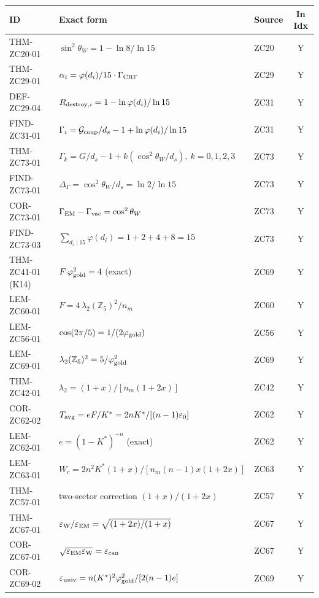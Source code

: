 \documentclass[11pt, a4paper]{article}
\newcommand{\swsq}{\sin^2\theta_W}
\newcommand{\cwsq}{\cos^2\theta_W}
\newcommand{\Zfi}{\mathbb{Z}_5}
\newcommand{\Gcoup}{\mathcal{G}_{\rm coup}}
\newcommand{\epscan}{\varepsilon_{\rm can}}
\newcommand{\phig}{\varphi_{\rm gold}}
\newcommand{\Tavg}{T_{\rm avg}}
\newcommand{\Kstar}{K^*}
\begin{document}
\smallskip
{\small
\begin{longtable}{p{2.7cm} p{7.6cm} p{2.0cm} c}
\toprule
ID & Exact form & Source & In Idx \\
\midrule
\endhead
THM-ZC20-01 & $\swsq = 1 - \ln 8/\ln 15$ & ZC20 & Y \\
THM-ZC29-01 & $\alpha_i = \varphi(d_i)/15 \cdot \Gamma_{\rm CRF}$ & ZC29 & Y \\
DEF-ZC29-04 & $R_{{\rm destroy},i} = 1 - \ln\varphi(d_i)/\ln 15$ & ZC31 & Y \\
FIND-ZC31-01 & $\Gamma_i = \Gcoup/d_s - 1 + \ln\varphi(d_i)/\ln 15$ & ZC31 & Y \\
THM-ZC73-01 & $\Gamma_k = G/d_s - 1 + k(\cwsq/d_s),\ k=0,1,2,3$ & ZC73 & Y \\
FIND-ZC73-01 & $\Delta_\Gamma = \cwsq/d_s = \ln 2/\ln 15$ & ZC73 & Y \\
COR-ZC73-01 & $\Gamma_{\rm EM} - \Gamma_{\rm vac} = \cwsq$ & ZC73 & Y \\
FIND-ZC73-03 & $\sum_{d_i\mid 15}\varphi(d_i) = 1{+}2{+}4{+}8 = 15$ & ZC73 & Y \\
THM-ZC41-01 (K14) & $F\,\phig^{2} = 4$ (exact) & ZC69 & Y \\
LEM-ZC60-01 & $F = 4\,\lambda_2(\Zfi)^2/n_m$ & ZC60 & Y \\
LEM-ZC56-01 & $\cos(2\pi/5) = 1/(2\phig)$ & ZC56 & Y \\
LEM-ZC69-01 & $\lambda_2(\Zfi)^2 = 5/\phig^2$ & ZC69 & Y \\
THM-ZC42-01 & $\lambda_2 = (1+x)/[n_m(1+2x)]$ & ZC42 & Y \\
COR-ZC62-02 & $\Tavg = eF/\Kstar = 2n\Kstar/[(n-1)\varepsilon_0]$ & ZC62 & Y \\
LEM-ZC62-01 & $e = (1-\Kstar)^{-n}$ (exact) & ZC62 & Y \\
LEM-ZC63-01 & $W_c = 2n^2\Kstar(1+x)/[n_m(n-1)x(1+2x)]$ & ZC63 & Y \\
THM-ZC57-01 & two-sector correction $(1+x)/(1+2x)$ & ZC57 & Y \\
THM-ZC67-01 & $\varepsilon_{\rm W}/\varepsilon_{\rm EM} = \sqrt{(1+2x)/(1+x)}$ & ZC67 & Y \\
COR-ZC67-01 & $\sqrt{\varepsilon_{\rm EM}\varepsilon_{\rm W}} = \epscan$ & ZC67 & Y \\
COR-ZC69-02 & $\varepsilon_{\rm univ} = n(\Kstar)^2\phig^2/[2(n-1)e]$ & ZC69 & Y \\

\end{longtable}}
\end{document}
